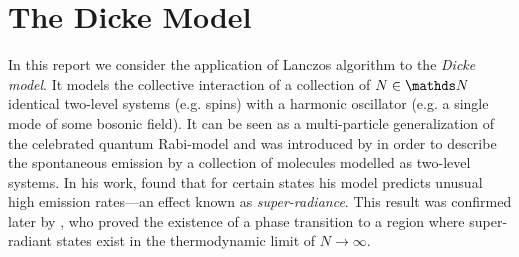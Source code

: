 \section{The Dicke Model}
In this report we consider the application of Lanczos algorithm to the \emph{Dicke model}.
It models the collective interaction of a collection of \(N\in\N\) identical two-level systems (e.g. spins) with a harmonic oscillator (e.g. a single mode of some bosonic field).
It can be seen as a multi-particle generalization of the celebrated quantum Rabi-model \cite{rabiSpaceQuantizationGyrating1937} and was introduced by \textcite{dickeCoherenceSpontaneousRadiation1954} in order to describe the spontaneous emission by a collection of molecules modelled as two-level systems.
In his work, \citeauthor{dickeCoherenceSpontaneousRadiation1954} found that for certain states his model predicts unusual high emission rates---an effect known as \emph{super-radiance}.
This result was confirmed later by \textcite{heppSuperradiantPhaseTransition1973}, who proved the existence of a phase transition to a region where super-radiant states exist in the thermodynamic limit of \(N\to\infty\).

